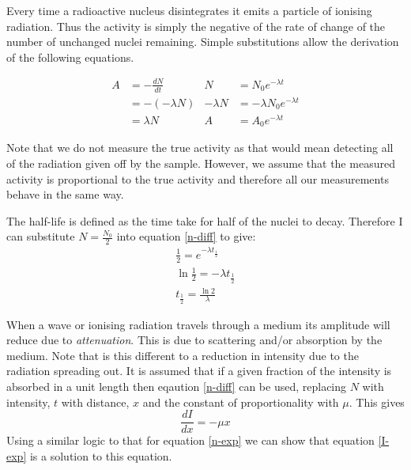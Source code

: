\documentclass[main.tex]{subfiles}
\begin{document}
Every time a radioactive nucleus disintegrates it emits a particle of ionising radiation. Thus the activity is simply the negative of the rate of change of the number of unchanged nuclei remaining. Simple substitutions allow the derivation of the following equations.

\begin{align*}
A &= -\frac{dN}{dt} & N &= N_0 e^{-\lambda t} \\
&= -(-\lambda N) & -\lambda N &= -\lambda N_0 e^{-\lambda t} \\
&= \lambda N & A &= A_0e^{-\lambda t}
\end{align*}

Note that we do not measure the true activity as that would mean detecting all of the radiation given off by the sample. However, we assume that the measured activity is proportional to the true activity and therefore all our measurements behave in the same way.


The half-life is defined as the time take for half of the nuclei to decay. Therefore I can substitute $N = \frac{N_0}{2}$ into equation \ref{n-diff} to give:
\begin{align*}
\frac{1}{2} = e^{-\lambda t_\frac{1}{2}}  \\
\ln{\frac{1}{2}} = -\lambda t_\frac{1}{2} \\
t_\frac{1}{2} = \frac{\ln{2}}{\lambda}
\end{align*}



When a wave or ionising radiation travels through a medium its amplitude will reduce due to \emph{attenuation}. This is due to scattering and/or absorption by the medium. Note that is this different to a reduction in intensity due to the radiation spreading out. It is assumed that if a given fraction of the intensity is absorbed in a unit length then eqaution \ref{n-diff} can be used, replacing $N$ with intensity, $t$ with distance, $x$ and the constant of proportionality with $\mu$. This gives
\begin{equation} \label{I-diff}
\frac{dI}{dx} = -\mu x
\end{equation}
Using a similar logic to that for equation \ref{n-exp} we can show that equation \ref{I-exp} is a solution to this equation.
\end{document}
